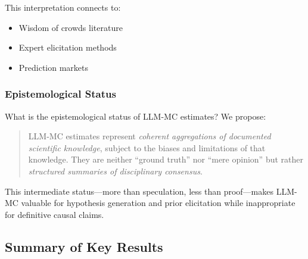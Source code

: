 This interpretation connects to:
\begin{itemize}
    \item Wisdom of crowds literature \citep{surowiecki2005wisdom}
    \item Expert elicitation methods \citep{ohaganelicitation}
    \item Prediction markets \citep{wolfers2004prediction}
\end{itemize}

\subsubsection{Epistemological Status}

What is the epistemological status of LLM-MC estimates? We propose:

\begin{quote}
LLM-MC estimates represent \textit{coherent aggregations of documented scientific knowledge}, subject to the biases and limitations of that knowledge. They are neither ``ground truth'' nor ``mere opinion'' but rather \textit{structured summaries of disciplinary consensus}.
\end{quote}

This intermediate status---more than speculation, less than proof---makes LLM-MC valuable for hypothesis generation and prior elicitation while inappropriate for definitive causal claims.



\subsection{Summary of Key Results}
\label{sec:AN-results}

